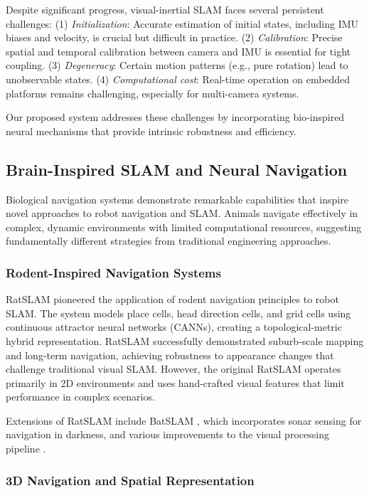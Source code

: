 Despite significant progress, visual-inertial SLAM faces several persistent challenges:
(1) \textit{Initialization}: Accurate estimation of initial states, including IMU biases and velocity, is crucial but difficult in practice.
(2) \textit{Calibration}: Precise spatial and temporal calibration between camera and IMU is essential for tight coupling.
(3) \textit{Degeneracy}: Certain motion patterns (e.g., pure rotation) lead to unobservable states.
(4) \textit{Computational cost}: Real-time operation on embedded platforms remains challenging, especially for multi-camera systems.

Our proposed system addresses these challenges by incorporating bio-inspired neural mechanisms that provide intrinsic robustness and efficiency.


\subsection{Brain-Inspired SLAM and Neural Navigation}

Biological navigation systems demonstrate remarkable capabilities that inspire novel approaches to robot navigation and SLAM.
Animals navigate effectively in complex, dynamic environments with limited computational resources, suggesting fundamentally different strategies from traditional engineering approaches.

\subsubsection{Rodent-Inspired Navigation Systems}

RatSLAM \cite{Milford2004, Milford2008, Milford2010} pioneered the application of rodent navigation principles to robot SLAM.
The system models place cells, head direction cells, and grid cells using continuous attractor neural networks (CANNs), creating a topological-metric hybrid representation.
RatSLAM successfully demonstrated suburb-scale mapping and long-term navigation, achieving robustness to appearance changes that challenge traditional visual SLAM.
However, the original RatSLAM operates primarily in 2D environments and uses hand-crafted visual features that limit performance in complex scenarios.

Extensions of RatSLAM include BatSLAM \cite{Steckel2013}, which incorporates sonar sensing for navigation in darkness, and various improvements to the visual processing pipeline \cite{Milford2011a, Milford2011b}.

\subsubsection{3D Navigation and Spatial Representation}

